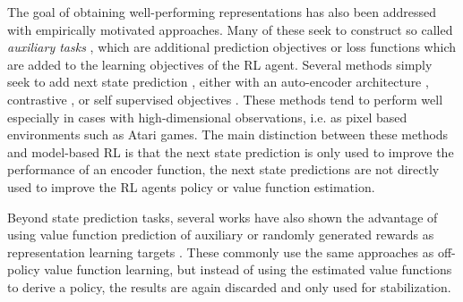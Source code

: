 The goal of obtaining well-performing representations has also been addressed with empirically motivated approaches.
Many of these seek to construct so called \emph{auxiliary tasks} \parencite{jaderberg2017reinforcement}, which are additional prediction objectives or loss functions which are added to the learning objectives of the RL agent.
Several methods simply seek to add next state prediction , either with an auto-encoder architecture \parencite{jaderberg2017reinforcement}, contrastive \parencite{laskin2020contrastive}, or self supervised objectives \parencite{gelada2019deepmdp,schwarzer2021dataefficient,schwarzer2021pretraining,tang2023understanding}.
These methods tend to perform well especially in cases with high-dimensional observations, i.e. as pixel based environments such as Atari games.
The main distinction between these methods and model-based RL is that the next state prediction is only used to improve the performance of an encoder function, the next state predictions are not directly used to improve the RL agents policy or value function estimation.

Beyond state prediction tasks, several works have also shown the advantage of using value function prediction of auxiliary or randomly generated rewards as representation learning targets \parencite{lyle2021effect,farebrother2023protovalue}.
These commonly use the same approaches as off-policy value function learning, but instead of using the estimated value functions to derive a policy, the results are again discarded and only used for stabilization.


